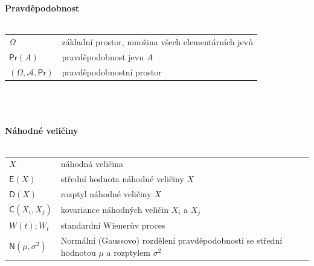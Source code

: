 \documentclass[a4paper,12pt]{report}
\theoremstyle{definition} \newtheorem{definice}[veta]{Definice}
\theoremstyle{remark}
\begin{document}
\normalsize
\textbf{Pravděpodobnost}\\\\
   \begin{tabular}{p{4cm} p{9.3cm}}
   $\Omega$                                          &   základní prostor, množina všech elementárních jevů \\
   $\mathsf{Pr}(A)$                               &  pravděpodobnost jevu $A$ \\
   $(\Omega,\mathcal{A}, \mathsf{Pr})$                         &   pravděpodobnostní prostor \\
   \end{tabular}\\\\\\
%
%
%
\textbf{Náhodné veličiny}\\\\
   \begin{tabular}{p{4cm} p{9.3cm}}
   $X$                                              &   náhodná veličina \\
   $\mathsf{E}(X)$                          &   střední hodnota náhodné veličiny $X$ \\
   $\mathsf{D}(X)$                          &   rozptyl náhodné veličiny $X$ \\
   $\mathsf{C}(X_i,X_j)$                 &   kovariance náhodných veličin $X_i$ a $X_j$\\
   $W(t); W_t$                                 &    standardní Wienerův proces \\
   $\mathsf{N}(\mu, \sigma^{2})$                     &   Normální (Gaussovo) rozdělení pravděpodobnosti se střední hodnotou $\mu$ a rozptylem $\sigma^2$  \\
   \end{tabular}\\\\\\
\end{document}
